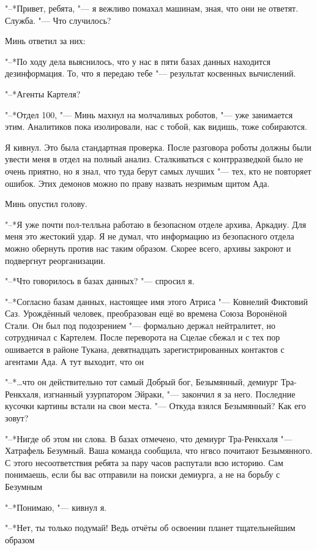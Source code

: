 "--*Привет, ребята, "--- я вежливо помахал машинам, зная, что они не ответят.
Служба.
"--- Что случилось?

Минь ответил за них:

"--*По ходу дела выяснилось, что у нас в пяти базах данных находится дезинформация.
То, что я передаю тебе "--- результат косвенных вычислений.

"--*Агенты Картеля?

"--*Отдел 100, "--- Минь махнул на молчаливых роботов, "--- уже занимается этим.
Аналитиков пока изолировали, нас с тобой, как видишь, тоже собираются.

Я кивнул.
Это была стандартная проверка.
После разговора роботы должны были увести меня в отдел на полный анализ.
Сталкиваться с контрразведкой было не очень приятно, но я знал, что туда берут самых лучших "--- тех, кто не повторяет ошибок.
Этих демонов можно по праву назвать незримым щитом Ада.

Минь опустил голову.

"--*Я уже почти пол-телльна работаю в безопасном отделе архива, Аркадиу.
Для меня это жестокий удар.
Я не думал, что информацию из безопасного отдела можно обернуть против нас таким образом.
Скорее всего, архивы закроют и подвергнут реорганизации.

"--*Что говорилось в базах данных? "--- спросил я.

"--*Согласно базам данных, настоящее имя этого Атриса "--- Ковнелий Фиктовий Саз.
Урождённый человек, преобразован ещё во времена Союза Воронёной Стали.
Он был под подозрением "--- формально держал нейтралитет, но сотрудничал с Картелем.
После переворота на Сцелае сбежал и с тех пор ошивается в районе Тукана, девятнадцать зарегистрированных контактов с агентами Ада.
А тут выходит, что он\ldotst

"--*\ldots что он действительно тот самый Добрый бог, Безымянный, демиург Тра-Ренкхаля, изгнанный узурпатором Эйраки, "--- закончил я за него.
Последние кусочки картины встали на свои места.
"--- Откуда взялся Безымянный?
Как его зовут?

"--*Нигде об этом ни слова. В базах отмечено, что демиург Тра-Ренкхаля "--- Хатрафель Безумный.
Ваша команда сообщила, что нгвсо почитают Безымянного.
С этого несоответствия ребята за пару часов распутали всю историю.
Сам понимаешь, если бы вас отправили на поиски демиурга, а не на борьбу с Безумным\ldotst

"--*Понимаю, "--- кивнул я.

"--*Нет, ты только подумай!
Ведь отчёты об освоении планет тщательнейшим образом\ldotst

